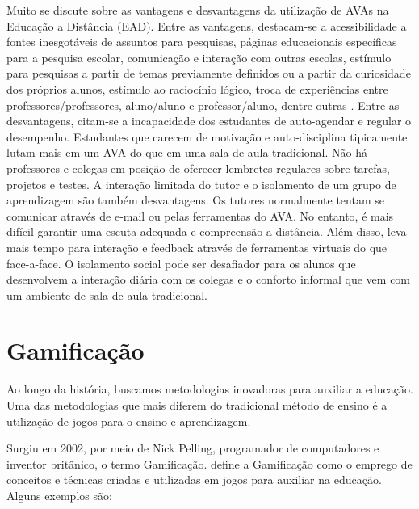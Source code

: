 Muito se discute sobre as vantagens e desvantagens da utiliza\c{c}\~ao de AVAs na Educa\c{c}\~ao a Dist\^ancia (EAD). Entre as vantagens, 
destacam-se a acessibilidade a fontes inesgotáveis de assuntos para pesquisas, páginas educacionais específicas para a pesquisa escolar, 
comunicação e interação com outras escolas, estímulo para pesquisas a partir de temas previamente definidos ou a partir da curiosidade dos 
próprios alunos, estímulo ao raciocínio lógico, troca de experiências entre professores/professores, aluno/aluno e professor/aluno, dentre 
outras . Entre as desvantagens, citam-se a incapacidade dos estudantes de auto-agendar e regular o 
desempenho. Estudantes que carecem de motivação e auto-disciplina tipicamente lutam mais em um AVA do que em uma sala de aula 
tradicional. Não há professores e colegas em posição de oferecer lembretes regulares sobre tarefas, projetos e testes. A interação limitada 
do tutor e o isolamento de um grupo de aprendizagem são também desvantagens. Os tutores normalmente tentam se comunicar através de e-mail 
ou pelas ferramentas do AVA. No entanto, é mais difícil garantir uma escuta adequada e compreensão a distância. Além disso, leva mais tempo 
para interação e feedback através de ferramentas virtuais do que face-a-face. O isolamento social pode ser desafiador 
para os alunos que desenvolvem a interação diária com os colegas e o conforto informal que vem com um ambiente de sala de aula tradicional.

\section{Gamificação}

Ao longo da história, buscamos metodologias inovadoras para auxiliar a educação. Uma das metodologias que mais diferem do tradicional método de ensino é a utilização de jogos para o ensino e aprendizagem. 

Surgiu em 2002, por meio de Nick Pelling, programador de computadores e inventor britânico, o termo Gamificação.  define a Gamificação como o emprego de conceitos e 
técnicas criadas e utilizadas em jogos para auxiliar na educação. Alguns exemplos s\~ao:

